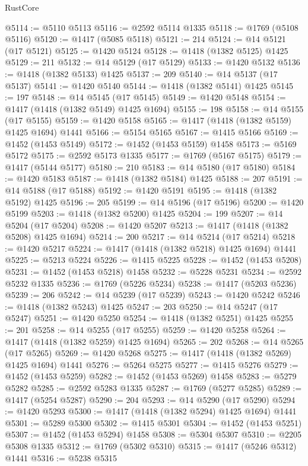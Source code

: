 \begin{lexlean}{RustCore}
\begin{coremodule}
@5114 := @5110 @5113
@5116 := @2592 @5114 @1335
@5118 := @1769 (@5108 @5116)
@5120 := @1417 (@5085 @5118)
@5121 := 214
@5124 := @14 @5121 (@17 @5121)
@5125 := @1420 @5124
@5128 := @1418 (@1382 @5125) @1425
@5129 := 211
@5132 := @14 @5129 (@17 @5129)
@5133 := @1420 @5132
@5136 := @1418 (@1382 @5133) @1425
@5137 := 209
@5140 := @14 @5137 (@17 @5137)
@5141 := @1420 @5140
@5144 := @1418 (@1382 @5141) @1425
@5145 := 197
@5148 := @14 @5145 (@17 @5145)
@5149 := @1420 @5148
@5154 := @1417 (@1418 (@1382 @5149) @1425 @1694)
@5155 := 198
@5158 := @14 @5155 (@17 @5155)
@5159 := @1420 @5158
@5165 := @1417 (@1418 (@1382 @5159) @1425 @1694) @1441
@5166 := @5154 @5165
@5167 := @1415 @5166
@5169 := @1452 (@1453 @5149)
@5172 := @1452 (@1453 @5159) @1458
@5173 := @5169 @5172
@5175 := @2592 @5173 @1335
@5177 := @1769 (@5167 @5175)
@5179 := @1417 (@5144 @5177)
@5180 := 210
@5183 := @14 @5180 (@17 @5180)
@5184 := @1420 @5183
@5187 := @1418 (@1382 @5184) @1425
@5188 := 207
@5191 := @14 @5188 (@17 @5188)
@5192 := @1420 @5191
@5195 := @1418 (@1382 @5192) @1425
@5196 := 205
@5199 := @14 @5196 (@17 @5196)
@5200 := @1420 @5199
@5203 := @1418 (@1382 @5200) @1425
@5204 := 199
@5207 := @14 @5204 (@17 @5204)
@5208 := @1420 @5207
@5213 := @1417 (@1418 (@1382 @5208) @1425 @1694)
@5214 := 200
@5217 := @14 @5214 (@17 @5214)
@5218 := @1420 @5217
@5224 := @1417 (@1418 (@1382 @5218) @1425 @1694) @1441
@5225 := @5213 @5224
@5226 := @1415 @5225
@5228 := @1452 (@1453 @5208)
@5231 := @1452 (@1453 @5218) @1458
@5232 := @5228 @5231
@5234 := @2592 @5232 @1335
@5236 := @1769 (@5226 @5234)
@5238 := @1417 (@5203 @5236)
@5239 := 206
@5242 := @14 @5239 (@17 @5239)
@5243 := @1420 @5242
@5246 := @1418 (@1382 @5243) @1425
@5247 := 203
@5250 := @14 @5247 (@17 @5247)
@5251 := @1420 @5250
@5254 := @1418 (@1382 @5251) @1425
@5255 := 201
@5258 := @14 @5255 (@17 @5255)
@5259 := @1420 @5258
@5264 := @1417 (@1418 (@1382 @5259) @1425 @1694)
@5265 := 202
@5268 := @14 @5265 (@17 @5265)
@5269 := @1420 @5268
@5275 := @1417 (@1418 (@1382 @5269) @1425 @1694) @1441
@5276 := @5264 @5275
@5277 := @1415 @5276
@5279 := @1452 (@1453 @5259)
@5282 := @1452 (@1453 @5269) @1458
@5283 := @5279 @5282
@5285 := @2592 @5283 @1335
@5287 := @1769 (@5277 @5285)
@5289 := @1417 (@5254 @5287)
@5290 := 204
@5293 := @14 @5290 (@17 @5290)
@5294 := @1420 @5293
@5300 := @1417 (@1418 (@1382 @5294) @1425 @1694) @1441
@5301 := @5289 @5300
@5302 := @1415 @5301
@5304 := @1452 (@1453 @5251)
@5307 := @1452 (@1453 @5294) @1458
@5308 := @5304 @5307
@5310 := @2205 @5308 @1335
@5312 := @1769 (@5302 @5310)
@5315 := @1417 (@5246 @5312) @1441
@5316 := @5238 @5315

\end{coremodule}
\end{lexlean}
